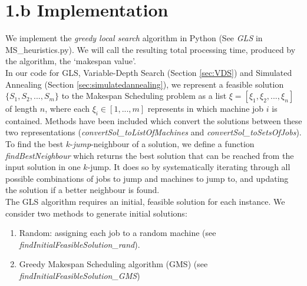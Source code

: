 \documentclass[12pt,a4paper,reqno]{article}
\begin{document}

\section*{1.b Implementation} \label{sec:implementation}
We implement the \textit{greedy local search} algorithm in Python (See \emph{GLS} in MS\_heuristics.py). We will call the resulting total processing time, produced by the algorithm, the `makespan value'. \\

In our code for GLS, Variable-Depth Search (Section \ref{sec:VDS}) and Simulated Annealing (Section \ref{sec:simulatedannealing}), we represent a feasible solution $\{S_1,S_2,...,S_m\}$ to the Makespan Scheduling problem as a list $\xi = [\xi_1,\xi_2,...,\xi_n]$ of length $n$, where each $\xi_i \in [1,...,m]$ represents in which machine job $i$ is contained. Methods have been included which convert the solutions between these two representations (\textit{convertSol\_toListOfMachines} and \textit{convertSol\_toSetsOfJobs}). \\

To find the best $k$-\emph{jump}-neighbour of a solution, we define a function \emph{findBestNeighbour} which returns the best solution that can be reached from the input solution in one $k$-jump. It does so by systematically iterating through all possible combinations of jobs to jump and machines to jump to, and updating the solution if a better neighbour is found.\\

The GLS algorithm requires an initial, feasible solution for each instance. We consider two methods to generate initial solutions:
\begin{enumerate}
\item Random: assigning each job to a random machine (see \emph{findInitialFeasibleSolution\_rand}).
\item Greedy Makespan Scheduling algorithm (GMS) (see \emph{findInitialFeasibleSolution\_GMS})
\end{enumerate}
\end{document}
